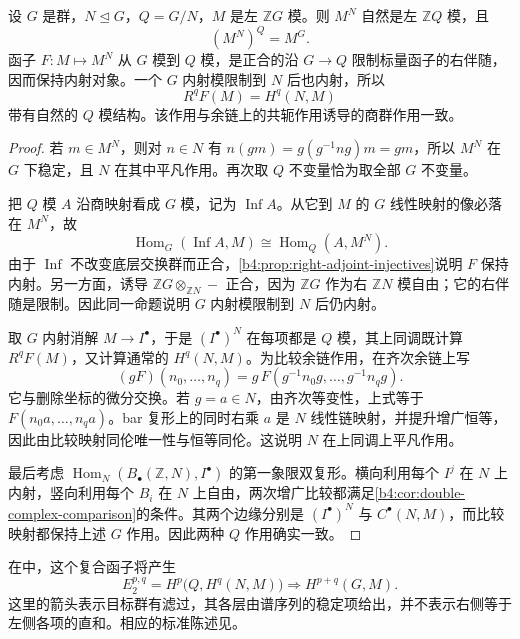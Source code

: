 \begin{proposition}\label{b4:prop:normal-subgroup-invariants}
设 \(G\) 是群，\(N\trianglelefteq G\)，\(Q=G/N\)，\(M\) 是左 \(\mathbb ZG\) 模。则 \(M^N\) 自然是左 \(\mathbb ZQ\) 模，且
\[
(M^N)^Q=M^G.
\]
函子 \(F:M\mapsto M^N\) 从 \(G\) 模到 \(Q\) 模，是正合的沿 \(G\to Q\) 限制标量函子的右伴随，因而保持内射对象。一个 \(G\) 内射模限制到 \(N\) 后也内射，所以
\[
R^qF(M)=H^q(N,M)
\]
带有自然的 \(Q\) 模结构。该作用与余链上的共轭作用诱导的商群作用一致。
\end{proposition}
\begin{proof}
若 \(m\in M^N\)，则对 \(n\in N\) 有 \(n(gm)=g(g^{-1}ng)m=gm\)，所以 \(M^N\) 在 \(G\) 下稳定，且 \(N\) 在其中平凡作用。再次取 \(Q\) 不变量恰为取全部 \(G\) 不变量。

把 \(Q\) 模 \(A\) 沿商映射看成 \(G\) 模，记为 \(\operatorname{Inf}A\)。从它到 \(M\) 的 \(G\) 线性映射的像必落在 \(M^N\)，故
\[
\operatorname{Hom}_G(\operatorname{Inf}A,M)
\cong\operatorname{Hom}_Q(A,M^N).
\]
由于 \(\operatorname{Inf}\) 不改变底层交换群而正合，\cref{b4:prop:right-adjoint-injectives}说明 \(F\) 保持内射。另一方面，诱导 \(\mathbb ZG\otimes_{\mathbb ZN}-\) 正合，因为 \(\mathbb ZG\) 作为右 \(\mathbb ZN\) 模自由；它的右伴随是限制。因此同一命题说明 \(G\) 内射模限制到 \(N\) 后仍内射。

取 \(G\) 内射消解 \(M\to I^\bullet\)，于是 \((I^\bullet)^N\) 在每项都是 \(Q\) 模，其上同调既计算 \(R^qF(M)\)，又计算通常的 \(H^q(N,M)\)。为比较余链作用，在齐次余链上写
\[
(gF)(n_0,\ldots,n_q)
=g\,F(g^{-1}n_0g,\ldots,g^{-1}n_qg).
\]
它与删除坐标的微分交换。若 \(g=a\in N\)，由齐次等变性，上式等于 \(F(n_0a,\ldots,n_qa)\)。bar 复形上的同时右乘 \(a\) 是 \(N\) 线性链映射，并提升增广恒等，因此由比较映射同伦唯一性与恒等同伦。这说明 \(N\) 在上同调上平凡作用。

最后考虑 \(\operatorname{Hom}_N(B_\bullet(\mathbb Z,N),I^\bullet)\) 的第一象限双复形。横向利用每个 \(I^j\) 在 \(N\) 上内射，竖向利用每个 \(B_i\) 在 \(N\) 上自由，两次增广比较都满足\cref{b4:cor:double-complex-comparison}的条件。其两个边缘分别是 \((I^\bullet)^N\) 与 \(C^\bullet(N,M)\)，而比较映射都保持上述 \(G\) 作用。因此两种 \(Q\) 作用确实一致。
\end{proof}

在中，这个复合函子将产生
\[
E_2^{p,q}=H^p\bigl(Q,H^q(N,M)\bigr)
\Longrightarrow H^{p+q}(G,M).
\]
这里的箭头表示目标群有滤过，其各层由谱序列的稳定项给出，并不表示右侧等于左侧各项的直和。相应的标准陈述见\cite[Lyndon/Hochschild-Serre Spectral Sequence 6.8.2]{Weibel1994HomologicalAlgebra}。


